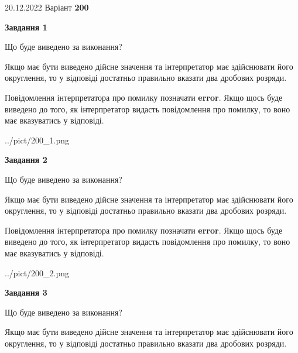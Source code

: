 \documentclass[12pt, ukrainian]{article}
\begin{document}
{20.12.2022 Варіант \No \textbf { 200 }\par}
{
\begin {Large}

{\begin {center}\textbf{Завдання 1}\end {center}}\par
Що буде виведено за виконання? \par

Якщо має бути виведено дійсне значення та інтерпретатор має здійснювати його округлення, 
то у відповіді достатньо правильно вказати два дробових розряди.

Повідомлення інтерпретатора про помилку позначати \textbf{error}.
Якщо щось буде виведено до того, як інтерпретатор видасть повідомлення про помилку, 
то воно має вказуватись у відповіді. \par

\begin{center}
	{../pict/200_1.png}
\end{center}
\newpage

{\begin {center}\textbf{Завдання 2}\end {center}}\par
Що буде виведено за виконання? \par

Якщо має бути виведено дійсне значення та інтерпретатор має здійснювати його округлення, 
то у відповіді достатньо правильно вказати два дробових розряди.

Повідомлення інтерпретатора про помилку позначати \textbf{error}.
Якщо щось буде виведено до того, як інтерпретатор видасть повідомлення про помилку, 
то воно має вказуватись у відповіді. \par

\begin{center}
	{../pict/200_2.png}
\end{center}
\newpage

{\begin {center}\textbf{Завдання 3}\end {center}}\par
Що буде виведено за виконання? \par

Якщо має бути виведено дійсне значення та інтерпретатор має здійснювати його округлення, 
то у відповіді достатньо правильно вказати два дробових розряди.


\end{Large}}
\end{document}
